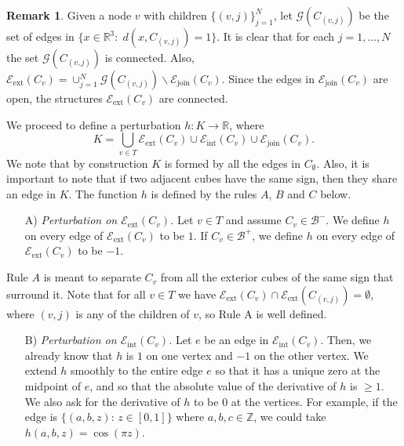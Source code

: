 \documentclass[11pt,reqno]{amsart}
\newcommand{\R}{{\mathbb R}}
\newcommand{\Z}{{\mathbb Z}}
\theoremstyle{definition}
\newtheorem{remark}{Remark}
\begin{document}
\begin{remark}  Given a node $v$ with children $\{(v,j)\}_{j=1}^N$, let $\mathcal G(C_{(v,j)})$ be the set of edges in $\{x \in \R^3:\; d(x, C_{(v,j)})=1\}$. It is clear that for each $j=1, \dots, N$ the set  $\mathcal G(C_{(v,j)})$ is connected. Also, $\mathcal E_{\text{ext}} (C_v) = \cup_{j=1}^N \mathcal G(C_{(v,j)}) \backslash \mathcal E_{\text{join}}(C_v)$. Since the  edges in $\mathcal E_{\text{join}}(C_v)$ are open, the structures  $\mathcal E_{\text{ext}} (C_v)$ are connected.
\end{remark}

\noindent  We  proceed to define a perturbation  $h:K \to \R$, where 
$$K=\bigcup_{v \in T} \mathcal E_{\text{ext}}(C_v)\cup \mathcal E_{\text{int}}(C_v)\cup   \mathcal E_{\text{join}}(C_v).$$ 
We note that by construction $K$ is formed by all the edges in $C_\emptyset$. 
Also, it is important to note that if two adjacent cubes have the same sign, then they share an edge in $K$.
The function $h$ is defined by the rules $A$, $B$ and $C$ below. \\

\begin{itemize}
\item[A)]  \emph{Perturbation on $\mathcal E_{\text{ext}} (C_v)$.} Let $v \in T$ and assume $C_v \in \mathcal B^-$. We define $h$  on every edge of  $\mathcal E_{\text{ext}} (C_v)$  to be $1$.   If  $C_v  \in \mathcal B^+$, we define $h$  on every edge of  $\mathcal E_{\text{ext}} (C_v)$  to be $-1$.   \\
\end{itemize}

\noindent Rule $A$ is meant to separate $C_v$ from all the exterior cubes of the same sign that surround it. Note that for all $v \in T$ we have $ \mathcal E_{\text{ext}} (C_v) \cap  \mathcal E_{\text{ext}} (C_{(v,j)})=\emptyset$, where $(v,j)$ is any of the children of $v$, so Rule A is well defined.\\

\begin{itemize}
\item[B)]  \emph{Perturbation on $\mathcal E_{\text{int}} (C_v)$.}  Let $e$ be an edge in $\mathcal E_{\text{int}}(C_v)$.  Then, we already know that $h$ is $1$ on one vertex and $-1$ on the other vertex. 
We extend $h$ smoothly to the entire edge $e$ so that it has a unique zero at the midpoint of $e$, and so that the absolute value of the derivative of $h$ is  $\geq 1$. We also ask for the derivative of $h$ to be $0$ at the vertices. For example,   if the edge is  $\{(a,b,z):\, z\in [0,1]\}$ where $a,b,c \in \Z$, we could take
 $h(a,b,z)=\cos(\pi z)$.  \\
\end{itemize}
\end{document}
